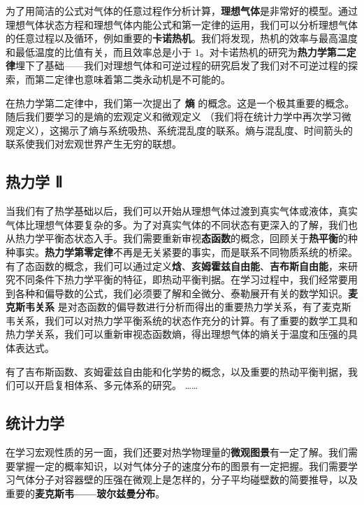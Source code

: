 为了用简洁的公式对气体的任意过程作分析计算，\textbf{理想气体}是非常好的模型。通过理想气体状态方程和理想气体内能公式和第一定律的运用，我们可以分析理想气体的任意过程以及循环，例如重要的\textbf{卡诺热机}。我们将发现，热机的效率与最高温度和最低温度的比值有关，而且效率总是小于 $1$。对卡诺热机的研究为\textbf{热力学第二定律}埋下了基础——我们对理想气体和可逆过程的研究启发了我们对不可逆过程的探索，而第二定律也意味着第二类永动机是不可能的。

在热力学第二定律中，我们第一次提出了 \textbf{熵} 的概念。这是一个极其重要的概念。随后我们要学习的是熵的宏观定义和微观定义 （我们将在统计力学中再次学习微观定义），这揭示了熵与系统吸热、系统混乱度的联系。熵与混乱度、时间箭头的联系使我们对宏观世界产生无穷的联想。

\subsection{热力学 Ⅱ}

当我们有了热学基础以后，我们可以开始从理想气体过渡到真实气体或液体，真实气体比理想气体要复杂的多。为了对真实气体的不同状态有更深入的了解，我们也从热力学平衡态状态入手。我们需要重新审视\textbf{态函数}的概念，回顾关于\textbf{热平衡}的种种事实。\textbf{热力学第零定律}不再是无关紧要的事实，而是联系不同物质系统的桥梁。有了态函数的概念，我们可以通过定义\textbf{焓}、\textbf{亥姆霍兹自由能}、\textbf{吉布斯自由能}，来研究不同条件下热力学平衡的特征，即热动平衡判据。在学习过程中，我们经常要用到各种和偏导数的公式，我们必须要了解和全微分、泰勒展开有关的数学知识。\textbf{麦克斯韦关系} 是对态函数的偏导数进行分析而得出的重要热力学关系，有了麦克斯韦关系，我们可以对热力学平衡系统的状态作充分的计算。有了重要的数学工具和热力学关系，我们可以重新审视态函数熵，得出理想气体的熵关于温度和压强的具体表达式。

有了吉布斯函数、亥姆霍兹自由能和化学势的概念，以及重要的热动平衡判据，我们可以开启复相体系、多元体系的研究。
……


\subsection{统计力学}

在学习宏观性质的另一面，我们还要对热学物理量的\textbf{微观图景}有一定了解。我们需要掌握一定的概率知识，以对气体分子的速度分布的图景有一定把握。我们需要学习气体分子对容器壁的压强在微观上是怎样的，分子平均碰壁数的简要推导，以及重要的\textbf{麦克斯韦——玻尔兹曼分布}。

